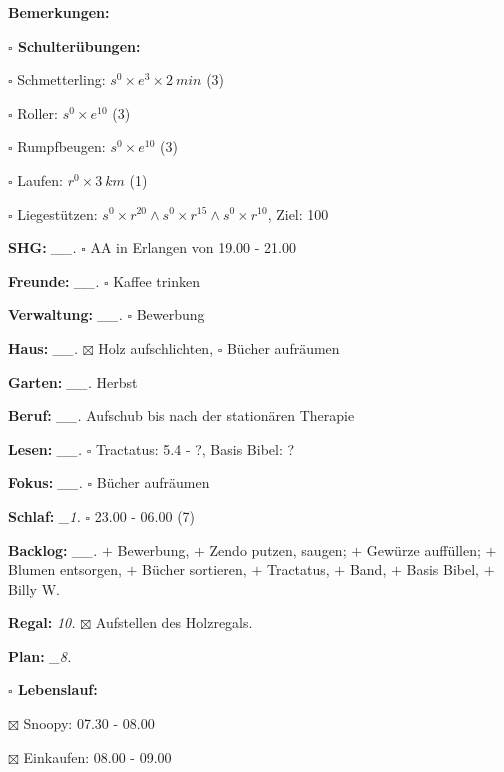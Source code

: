 \documentclass[10pt,a4paper]{article}
\newcommand\prop[1] {{\color {alizarin} {\bf #1}}}        %
\newcommand\opti[1] {{\color {amethyst} {\bf #1}}}        %
\newcommand\mand[1] {{\color {burntorange} {\bf #1}}}     %
\newcommand\topspace{\vskip -15pt \hskip 20pt}
\newcommand\bottomspace{\vskip 4pt}
\newcommand\n[1] { {\sl #1.} \hskip 5pt }
\begin{document}
\begin{mdframed}[style=daystyle]
\begin{labeling}{{\mand {Bemerkungen:}}}
\begin{minipage}{0.75\textwidth}
\begin{labeling}{\prop {$\square$ {Schulterübungen:}}}
      \item[$\square$ Schmetterling:]   $s^0 \times e^3 \times 2\ min$ (3)
      \item[$\square$ Roller:]          $s^0 \times e^{10}$ (3)
      \item[$\square$ Rumpfbeugen:]     $s^0 \times e^{10}$ (3)
      \item[$\square$ Laufen:]          $r^0 \times 3\ km$ (1)
      \item[$\square$ Liegestützen:]    $s^0 \times r^{20} \land s^0 \times r^{15} \land s^0 \times r^{10}$, Ziel: 100
      \end{labeling}
    \end{minipage}
    \bottomspace        
  \item[{\mand {SHG:}}]          \n{\_\_} $\square$ AA in Erlangen von 19.00 - 21.00
  \item[{\mand {Freunde:}}]      \n{\_\_} $\square$ Kaffee trinken
  \item[{\mand {Verwaltung:}}]   \n{\_\_} $\square$ Bewerbung
  \item[{\mand {Haus:}}]         \n{\_\_} $\boxtimes$ Holz aufschlichten, $\square$ Bücher aufräumen
  \item[{\mand {Garten:}}]       \n{\_\_} Herbst
  \item[{\mand {Beruf:}}]        \n{\_\_} Aufschub bis nach der stationären Therapie
  \item[{\mand {Lesen:}}]        \n{\_\_} $\square$ Tractatus: 5.4 - ?, Basis Bibel: ?
  \item[{\mand {Fokus:}}]        \n{\_\_} $\square$ Bücher aufräumen
  \item[{\mand {Schlaf:}}]        \n{\_1} $\square$ 23.00 - 06.00 (7)
  \item[{\mand {Backlog:}}]      \n{\_\_} 
    $+$ Bewerbung,
    $+$ Zendo putzen, saugen; $+$ Gewürze auffüllen; $+$ Blumen entsorgen, $+$ Bücher sortieren,
    $+$ Tractatus, $+$ Band, $+$ Basis Bibel, $+$ Billy W.
  \item[{\opti {Regal:}}]          \n{10} $\boxtimes$ Aufstellen des Holzregals.
  \item[{\mand {Plan:}}]          \n{\_8}
    \topspace
    \begin{minipage}{0.75\textwidth}  
      \begin{labeling}{\prop {$\square$ {Lebenslauf:}}} 
        \setlength\itemsep{-3pt}
      \item[$\boxtimes$ Snoopy:]     07.30 - 08.00
      \item[$\boxtimes$ Einkaufen:]  08.00 - 09.00

\end{labeling}
\end{minipage}
\end{labeling}
\end{mdframed}
\end{document}
